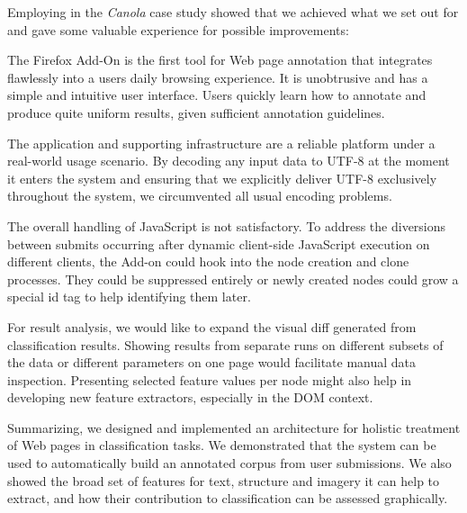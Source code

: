Employing {\KrdWrd} in the \textit{Canola} case study showed that we achieved what we set out for and gave some valuable experience for possible improvements:

The {\KrdWrd} Firefox Add-On is the first tool for Web page annotation that integrates flawlessly into a users daily browsing experience.
It is unobtrusive and has a simple and intuitive user interface.
Users quickly learn how to annotate and produce quite uniform results, given sufficient annotation guidelines.

The {\KrdWrd} application and supporting infrastructure are a reliable platform under a real-world usage scenario.
By decoding any input data to UTF-8 at the moment it enters the system and ensuring that we explicitly deliver UTF-8 exclusively throughout the system, we circumvented all usual encoding problems.


The overall handling of JavaScript is not satisfactory.
To address the diversions between submits occurring after dynamic client-side JavaScript execution on different clients, the Add-on could hook into the node creation and clone processes.
They could be suppressed entirely or newly created nodes could grow a special id tag to help identifying them later.

For result analysis, we would like to expand the visual diff generated from classification results.
Showing results from separate runs on different subsets of the data or different parameters on one page would facilitate manual data inspection.
Presenting selected feature values per node might also help in developing new feature extractors, especially in the DOM context.


Summarizing, we designed and implemented an architecture for holistic treatment of Web pages in classification tasks.
We demonstrated that the {\KrdWrd} system can be used to automatically build an annotated corpus from user submissions.
We also showed the broad set of features for text, structure and imagery it can help to extract, and how their contribution to classification can be assessed graphically.

\review{

}

